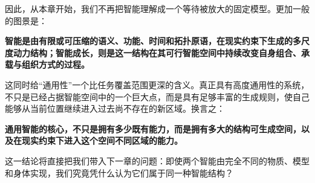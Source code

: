 因此，从本章开始，我们不再把智能理解成一个等待被放大的固定模型。更加一般的图景是：

\begin{statementbox}
\bfseries
智能是由有限或可压缩的语义、功能、时间和拓扑原语，在现实约束下生成的多尺度动力结构；智能成长，则是这一结构在其可行智能空间中持续改变自身组合、承载与组织方式的过程。
\end{statementbox}

这同时给“通用性”一个比任务覆盖范围更深的含义。真正具有高度通用性的系统，不只是已经占据智能空间中的一个巨大点，而是具有足够丰富的生成规则，使自己能够从当前位置继续进入过去尚不存在的新区域。换言之：

\begin{statementbox}
\bfseries
通用智能的核心，不只是拥有多少既有能力，而是拥有多大的结构可生成空间，以及在现实约束下进入这个空间不同区域的能力。
\end{statementbox}

这一结论将直接把我们带入下一章的问题：即使两个智能由完全不同的物质、模型和身体实现，我们究竟凭什么认为它们属于同一种智能结构？
